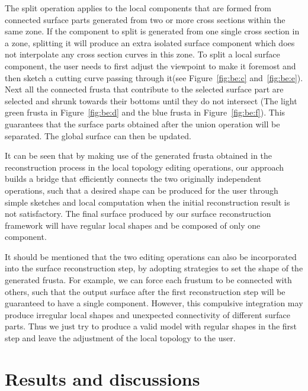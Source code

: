 The split operation applies  to the local components that are formed
from connected surface parts generated from two or more cross
sections within the same zone. If the component to split is
generated from one single cross section in a zone, splitting it will
produce an extra isolated surface component which does not
interpolate any cross section curves in this zone. To split a local
surface component, the user needs to first adjust the viewpoint to
make it foremost and then sketch a cutting curve passing through
it(see Figure~\ref{fig:be:c} and~\ref{fig:be:e}). Next all the
connected frusta that contribute to the selected surface part are
selected and shrunk towards their bottoms until they do not
intersect (The light green frusta in Figure~\ref{fig:be:d} and the
blue frusta in Figure~\ref{fig:be:f}). This guarantees that the
surface parts obtained after the union operation will be separated.
The global surface can then be updated.


It can be seen that  by making use of the generated frusta obtained
in the reconstruction process in the local topology editing
operations, our approach builds a bridge that efficiently connects
the two originally independent operations, such that a desired shape
can be produced for the user through simple sketches and local
computation when the initial reconstruction result is not
satisfactory. The final surface produced by our surface
reconstruction framework will have regular local shapes and be
composed of only one component.

It should be mentioned  that the two editing operations can also be
incorporated into the surface reconstruction step, by adopting
strategies to set the shape of the generated frusta. For example, we
can force each frustum to be connected with others, such that the
output surface after the first reconstruction step will be
guaranteed to have a single component. However, this compulsive
integration may produce irregular local shapes and unexpected
connectivity of different surface parts. Thus we just try to produce
a valid model with regular shapes in the first step and leave the
adjustment of the local topology to the user.




\section{Results and discussions}
\label{ch6:sec:result}


